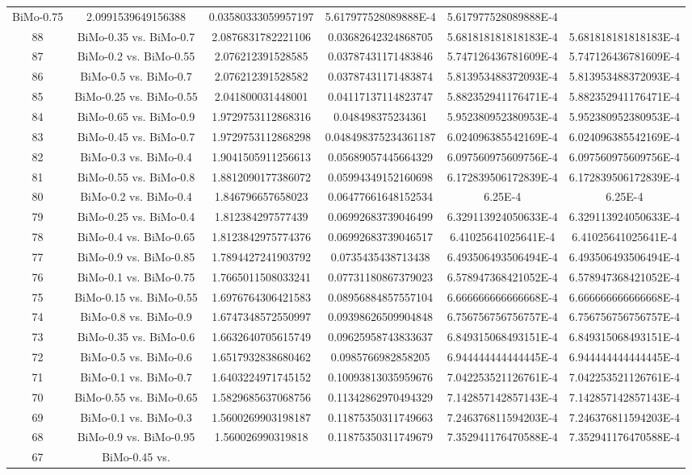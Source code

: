 \documentclass[a4paper,10pt]{article}
\begin{document}
\begin{landscape}
\begin{table}[!htp]
\begin{tabular}{cccccc}
BiMo-0.75&2.0991539649156388&0.03580333059957197&5.617977528089888E-4&5.617977528089888E-4\\88&BiMo-0.35 vs. BiMo-0.7&2.0876831782221106&0.03682642324868705&5.681818181818183E-4&5.681818181818183E-4\\87&BiMo-0.2 vs. BiMo-0.55&2.076212391528585&0.03787431171483846&5.747126436781609E-4&5.747126436781609E-4\\86&BiMo-0.5 vs. BiMo-0.7&2.076212391528582&0.03787431171483874&5.813953488372093E-4&5.813953488372093E-4\\85&BiMo-0.25 vs. BiMo-0.55&2.041800031448001&0.04117137114823747&5.882352941176471E-4&5.882352941176471E-4\\84&BiMo-0.65 vs. BiMo-0.9&1.9729753112868316&0.048498375234361&5.952380952380953E-4&5.952380952380953E-4\\83&BiMo-0.45 vs. BiMo-0.7&1.9729753112868298&0.048498375234361187&6.024096385542169E-4&6.024096385542169E-4\\82&BiMo-0.3 vs. BiMo-0.4&1.9041505911256613&0.05689057445664329&6.097560975609756E-4&6.097560975609756E-4\\81&BiMo-0.55 vs. BiMo-0.8&1.8812090177386072&0.05994349152160698&6.172839506172839E-4&6.172839506172839E-4\\80&BiMo-0.2 vs. BiMo-0.4&1.846796657658023&0.06477661648152534&6.25E-4&6.25E-4\\79&BiMo-0.25 vs. BiMo-0.4&1.812384297577439&0.06992683739046499&6.329113924050633E-4&6.329113924050633E-4\\78&BiMo-0.4 vs. BiMo-0.65&1.8123842975774376&0.06992683739046517&6.41025641025641E-4&6.41025641025641E-4\\77&BiMo-0.9 vs. BiMo-0.85&1.7894427241903792&0.0735435438713438&6.493506493506494E-4&6.493506493506494E-4\\76&BiMo-0.1 vs. BiMo-0.75&1.7665011508033241&0.07731180867379023&6.578947368421052E-4&6.578947368421052E-4\\75&BiMo-0.15 vs. BiMo-0.55&1.6976764306421583&0.08956884857557104&6.666666666666668E-4&6.666666666666668E-4\\74&BiMo-0.8 vs. BiMo-0.9&1.6747348572550997&0.09398626509904848&6.756756756756757E-4&6.756756756756757E-4\\73&BiMo-0.35 vs. BiMo-0.6&1.6632640705615749&0.09625958743833637&6.849315068493151E-4&6.849315068493151E-4\\72&BiMo-0.5 vs. BiMo-0.6&1.6517932838680462&0.0985766982858205&6.944444444444445E-4&6.944444444444445E-4\\71&BiMo-0.1 vs. BiMo-0.7&1.6403224971745152&0.10093813035959676&7.042253521126761E-4&7.042253521126761E-4\\70&BiMo-0.55 vs. BiMo-0.65&1.5829685637068756&0.11342862970494329&7.142857142857143E-4&7.142857142857143E-4\\69&BiMo-0.1 vs. BiMo-0.3&1.5600269903198187&0.11875350311749663&7.246376811594203E-4&7.246376811594203E-4\\68&BiMo-0.9 vs. BiMo-0.95&1.560026990319818&0.11875350311749679&7.352941176470588E-4&7.352941176470588E-4\\67&BiMo-0.45 vs. 
\end{tabular}
\end{table}
\end{landscape}
\end{document}
